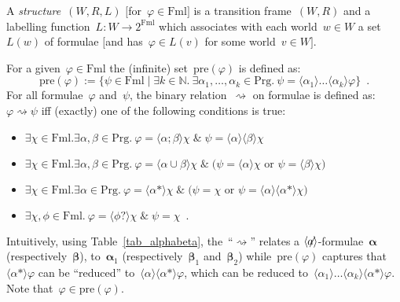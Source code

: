 \documentclass{entcs}
\newcommand{\Nat}{{\mathbb N}}
\newcommand{\xand}{\;\&\;}
\newcommand{\xor}{\text{ or }}
\newcommand{\pea}[2]{\langle#1\rangle #2}
\newcommand{\psp}[2]{#1;#2}
\newcommand{\pup}[2]{#1\cup#2}
\newcommand{\prp}[1]{#1*}
\newcommand{\pip}[1]{#1?}
\newcommand{\fml}{\mathrm{Fml}}
\newcommand{\prg}{\mathrm{Prg}}
\newcommand{\fean}{$\pea{\not\!\!a}{}$}
\newcommand{\ppre}[1]{\mathrm{pre}(#1)}
\newcommand{\pzz}{\mathrel{\rightsquigarrow}}
\newcommand{\talpha}{\boldsymbol{\alpha}}
\newcommand{\tbeta}{\boldsymbol{\beta}}
\begin{document}
\begin{definition}
  A \emph{structure}~$(W,R,L)$ $[$for~$\varphi \in \fml]$
  is a transition frame~$(W,R)$
  and a labelling function~$L: W \to 2^{\fml}$ which associates with each world~$w \in W$
  a set~$L(w)$ of formulae $[$and has~$\varphi \in L(v)$ for some world~$v \in W]$.
\end{definition}

\begin{definition}
  For a given~$\varphi \in \fml$
  the (infinite) set~$\ppre{\varphi}$ is defined as:
  \[ \ppre{\varphi} := \{ \psi \in \fml \mid \exists k \in \Nat.\: \exists \alpha_1, \dotsc, \alpha_k \in \prg.\: \psi = \pea{\alpha_1}{\dotsc \pea{\alpha_k}{\varphi}} \} \enspace.\]
  For all formulae~$\varphi$ and~$\psi$,
  the binary relation~$\pzz$ on formulae is defined as:
  $\varphi \pzz \psi$ iff (exactly) one of the following conditions is true:
  \begin{itemize}
  \item $\exists \chi \in \fml . \exists \alpha, \beta \in \prg.\: \varphi = \pea{\psp{\alpha}{\beta}}{\chi} \xand \psi = \pea{\alpha}{\pea{\beta}{\chi}}$
  \item $\exists \chi \in \fml . \exists \alpha, \beta \in \prg.\: \varphi = \pea{\pup{\alpha}{\beta}}{\chi}
    \xand \big( \psi = \pea{\alpha}{\chi} \xor \psi = \pea{\beta}{\chi} \big)$
  \item $\exists \chi \in \fml . \exists \alpha \in \prg.\:
    \varphi = \pea{\prp{\alpha}}{\chi} \xand
    \big( \psi = \chi \xor \psi = \pea{\alpha}{\pea{\prp{\alpha}}{\chi}} \big)$
  \item $\exists \chi, \phi \in \fml.\: \varphi = \pea{\pip{\phi}}{\chi} \xand \psi = \chi \enspace.$
  \end{itemize}
\end{definition}
Intuitively, using Table~\ref{tab_alphabeta},
the~``$\pzz$'' relates a \fean{}-formulae~$\talpha$ (respectively~$\tbeta$),
to~$\talpha_1$ (respectively~$\tbeta_1$ and~$\tbeta_2$)
while~$\ppre{\varphi}$ captures
that~$\pea{\prp{\alpha}}{\varphi}$ can be ``reduced'' to~$\pea{\alpha}{\pea{\prp{\alpha}}{\varphi}}$,
which can be reduced to~$\pea{\alpha_1}{\dotsc \pea{\alpha_k}{\pea{\prp{\alpha}}{\varphi}}}$.
Note that~$\varphi \in \ppre{\varphi}$.
\end{document}
